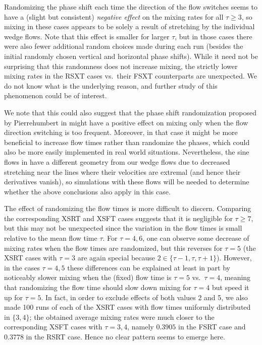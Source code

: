 \documentclass[12pt]{article}
\numberwithin{figure}{section}
\numberwithin{equation}{section}
\begin{document}
Randomizing the phase shift each time the direction of the flow switches seems to have a (slight but consistent) {\it negative effect} on the mixing rates for all $\tau\ge 3$, so mixing in these cases appears to be solely a result of stretching by the individual wedge flows.  Note that this effect is smaller for larger $\tau$, but in those cases there were also fewer additional random choices made during each run (besides the initial randomly chosen vertical and horizontal phase shifts).  While it need not be surprising that this randomness does not increase mixing, the strictly lower mixing rates in the RSXT cases vs.~their FSXT counterparts are unexpected.  We do not know what is the underlying reason, and further study of this phenomenon could be of interest.

We note that this could also suggest that the phase shift randomization proposed by Pierrehumbert in \cite{Pie,Pie2} might have a positive effect on mixing only when the flow direction switching is too frequent.  Moreover, in that case it might be more beneficial to increase flow times rather than randomize the phases, which could also be more easily implemented in real world situations.  Nevertheless, the sine flows in \cite{Pie,Pie2} have a different geometry from our wedge flows due to decreased stretching near the lines where their velocities are extremal (and hence their derivatives vanish), so simulations with these flows will be needed to determine whether the above conclusions also apply in this case.

The effect of randomizing the flow times is more difficult to discern.  Comparing the corresponding XSRT and XSFT cases suggests that it is negligible for $\tau\ge 7$, but this may not be unexpected since the variation in the flow times is small relative to the mean flow time $\tau$.  For $\tau=4,6$, one can observe some decrease of mixing rates when the flow times are randomized, but this reverses for $\tau=5$ 
(the XSRT cases with $\tau=3$ are again special because $2\in \{\tau-1,\tau,\tau+1\}$).  However, in the cases $\tau=4,5$ these differences can be explained at least in part by noticeably slower mixing when the (fixed) flow time is $\tau=5$ vs.~$\tau=4$, meaning that randomizing the flow time should slow down mixing for $\tau=4$ but speed it up for $\tau=5$.  In fact, in order to exclude  effects of both values 2 and 5, we also made 100 runs of each of the XSRT cases with flow times uniformly distributed in $\{3,4\}$; the obtained average mixing rates were much closer to the corresponding XSFT cases with $\tau=3,4$, namely $0.3905$ in the FSRT case and $0.3778$ in the RSRT case. Hence no clear pattern seems to emerge here.
\end{document}
